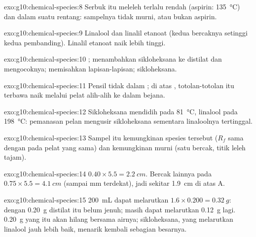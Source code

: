 \begin{solution}{exo:g10:chemical-species:8}
Serbuk itu meleleh terlalu rendah (aspirin: \qty{135}{\celsius}) dan
dalam suatu rentang: sampelnya tidak murni, atau bukan aspirin.
\end{solution}

\begin{solution}{exo:g10:chemical-species:9}
Linalool dan linalil etanoat (kedua bercaknya setinggi kedua
pembanding). Linalil etanoat naik lebih tinggi.
\end{solution}

\begin{solution}{exo:g10:chemical-species:10}
; menambahkan sikloheksana ke distilat dan mengocoknya;
memisahkan lapisan-lapisan;  sikloheksana.
\end{solution}

\begin{solution}{exo:g10:chemical-species:11}
Pensil tidak  dalam ; di atas , totolan-totolan itu
terbawa naik melalui pelat alih-alih  ke dalam bejana.
\end{solution}

\begin{solution}{exo:g10:chemical-species:12}
Sikloheksana mendidih pada \qty{81}{\celsius}, linalool pada
\qty{198}{\celsius}: pemanasan pelan mengusir sikloheksana sementara
linaloolnya tertinggal.
\end{solution}

\begin{solution}{exo:g10:chemical-species:13}
Sampel itu kemungkinan spesies tersebut ($R_f$ sama dengan  pada pelat yang sama) dan kemungkinan murni (satu bercak, titik
leleh tajam).
\end{solution}

\begin{solution}{exo:g10:chemical-species:14}
$0.40 \times 5.5 = \qty{2.2}{cm}$. Bercak lainnya pada $0.75 \times 5.5 =
\qty{4.1}{cm}$ (sampai mm terdekat), jadi sekitar \qty{1.9}{cm} di atas
A.
\end{solution}

\begin{solution}{exo:g10:chemical-species:15}
\qty{200}{mL} dapat melarutkan $1.6 \times 0.200 = \qty{0.32}{g}$:
dengan \qty{0.20}{g} distilat itu belum jenuh; masih dapat melarutkan
\qty{0.12}{g} lagi. \qty{0.20}{g} yang  itu akan hilang bersama
airnya; sikloheksana, yang melarutkan linalool jauh lebih baik, menarik
kembali sebagian besarnya.
\end{solution}

